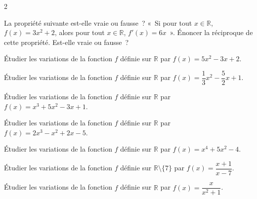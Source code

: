\documentclass[a4paper,12pt]{article}
\begin{document}
\begin{multicols}{2}
\begin{exercice}[title=Exercice 6 $\quad \star\star \quad$ { [Raisonner] }]{}{}
La propriété suivante est-elle vraie ou fausse ? « Si pour tout $x \in \mathbb{R}$, $f(x) = 3x^2 + 2$, alors pour tout $x \in \mathbb{R}$, $f'(x) = 6x$ ».  
Énoncer la réciproque de cette propriété. Est-elle vraie ou fausse ?
\end{exercice}

\begin{exercice}[title=Exercice 7 $\quad \star \quad$ { [Calculer] }]{}{}
Étudier les variations de la fonction $f$ définie sur $\mathbb{R}$ par $f(x) = 5x^2 - 3x + 2$.
\end{exercice}

\begin{exercice}[title=Exercice 8 $\quad \star \quad$ { [Calculer] }]{}{}
Étudier les variations de la fonction $f$ définie sur $\mathbb{R}$ par $f(x) = \dfrac{1}{3}x^2 - \dfrac{5}{2}x + 1$.
\end{exercice}

\begin{exercice}[title=Exercice 9 $\quad \star \quad$ { [Calculer] }]{}{}
Étudier les variations de la fonction $f$ définie sur $\mathbb{R}$ par $f(x) = x^3 + 5x^2 - 3x + 1$.
\end{exercice}
    
\begin{exercice}[title=Exercice 10 $\quad \star \quad$ { [Calculer] }]{}{}
Étudier les variations de la fonction $f$ définie sur $\mathbb{R}$ par $f(x) = 2x^3 - x^2 + 2x - 5$.
\end{exercice}

\begin{exercice}[title=Exercice 11 $\quad \star \quad$ { [Calculer] }]{}{}
Étudier les variations de la fonction $f$ définie sur $\mathbb{R}$ par $f(x) = x^4 + 5x^2 - 4$.
\end{exercice}

\begin{exercice}[title=Exercice 12 $\quad \star \quad$ { [Calculer] }]{}{}
Étudier les variations de la fonction $f$ définie sur $\mathbb{R} \setminus \{7\}$ par $f(x) = \dfrac{x+1}{x-7}$.
\end{exercice}

\begin{exercice}[title=Exercice 13 $\quad \star \quad$ { [Calculer] }]{}{}
Étudier les variations de la fonction $f$ définie sur $\mathbb{R}$ par $f(x) = \dfrac{x}{x^2 + 1}$.
\end{exercice}


\end{multicols}
\end{document}

